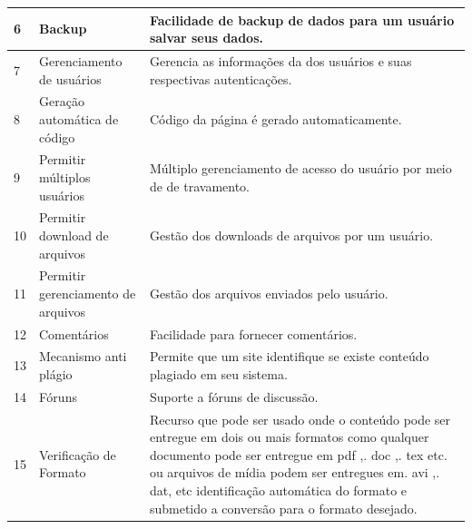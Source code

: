 \begin{apendicesenv}
\begin{landscape}
\begin{longtable}{|p{10pt}|p{220pt}|p{430pt}|}
 	 {\raggedright {6}}
 	  	 	 	 	 & {\raggedright {Backup}}
 	  	 	 	 	 & {\raggedright {Facilidade de backup de dados para um usuário salvar seus dados.\cite{Nath_Arora}}}\\
 	  	 	 	 	\hline
 	 {\raggedright {7}}
 	  	 	 	 	 & {\raggedright {Gerenciamento de usuários}}
 	  	 	 	 	 & {\raggedright {Gerencia as informações da dos usuários e suas respectivas autenticações.\cite{Nath_Arora}}}\\
 	  	 	 	 	\hline
 	 {\raggedright {8}}
 	  	 	 	 	 & {\raggedright {Geração automática de código}}
 	  	 	 	 	 & {\raggedright {Código da página é gerado automaticamente. \cite{Nath_Arora}}}\\
 	  	 	 	 	\hline
 	  	 	 	 	{\raggedright {9}}
 	  	 	 	 	 & {\raggedright {Permitir múltiplos usuários}}
 	  	 	 	 	 	 	 	 	 & {\raggedright {Múltiplo gerenciamento de acesso do usuário por meio de de travamento.\cite{Nath_Arora}}}\\
 	  	 	 	 	 	 	 	 	\hline 
 	 {\raggedright {10}}
 	  	 	 	 	 & {\raggedright {Permitir download de arquivos}}
 	  	 	 	 	 & {\raggedright {Gestão dos downloads de arquivos por um usuário.\cite{Nath_Arora}}}\\
 	  	 	 	 	\hline	

 {\raggedright {11}}
 	  	 	 	 	 & {\raggedright {Permitir gerenciamento de arquivos}}
 	  	 	 	 	 & {\raggedright {Gestão dos arquivos enviados pelo usuário.\cite{Nath_Arora}}}\\
 	  	 	 	 	\hline
 	 {\raggedright {12}}
 	  	 	 	 	 & {\raggedright {Comentários}}
 	  	 	 	 	 & {\raggedright {Facilidade para fornecer comentários.\cite{Nath_Arora}}}\\
 	  	 	 	 	\hline
 	 {\raggedright {13}}
 	  	 	 	 	 & {\raggedright {Mecanismo anti plágio}}
 	  	 	 	 	 & {\raggedright {Permite que um site identifique se existe conteúdo plagiado em seu sistema.\cite{Nath_Arora}}}\\
 	  	 	 	 	\hline
 	  	 	 	 	{\raggedright {14}}
 	  	 	 	 	 & {\raggedright {Fóruns}}
 	  	 	 	 	 	 	 	 	 & {\raggedright {Suporte a fóruns de discussão.\cite{Nath_Arora}}}\\
 	  	 	 	 	 	 	 	 	\hline 
 	 {\raggedright {15}}
 	  	 	 	 	 & {\raggedright {Verificação de Formato}}
 	  	 	 	 	 & {\raggedright {Recurso que pode ser usado onde o conteúdo pode ser entregue em dois ou mais formatos como qualquer documento pode ser entregue em pdf ,. doc ,. tex etc. ou arquivos de mídia podem ser entregues em. avi ,. dat, etc identificação automática do formato e submetido a conversão para o formato desejado.\cite{Nath_Arora}}}\\
 	  	 	 	 	\hline
 	  	 	 	 	 	  	 	 	 	

\end{longtable}
\end{landscape}
\end{apendicesenv}
